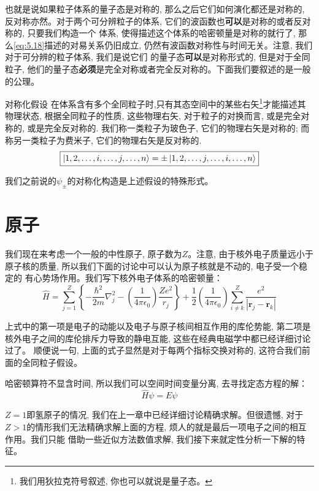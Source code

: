 也就是说如果粒子体系的量子态是对称的, 那么之后它们如何演化都还是对称的, 反对称亦然。对于两个可分辨粒子的体系, 它们的波函数也\textbf{可以}是对称的或者反对称的, 只要我们构造一个
体系, 使得描述这个体系的哈密顿量是对称的就行了, 那么\ref{eq:5.18}描述的对易关系仍旧成立, 仍然有波函数对称性与时间无关。注意, 我们对于可分辨的粒子体系, 我们是说它们
的量子态\textbf{可以}是对称形式的, 但是对于全同粒子, 他们的量子态\textbf{必须}是完全对称或者完全反对称的。下面我们要叙述的是一般的公理。
\begin{proposition}{对称化假设}
    在体系含有多个全同粒子时,只有其态空间中的某些右矢\footnote{我们用狄拉克符号叙述, 你也可以就说是量子态。}才能描述其物理状态, 根据全同粒子的性质, 这些物理右矢, 对于粒子的对换而言, 或是完全对称的, 或是完全反对称的. 我们称一类粒子为玻色子, 它们的物理右矢是对称的; 而称另一类粒子为费米子, 它们的物理右矢是反对称的.
    \begin{equation}
        \boxed{
            \ket{1,2,\ldots,i,\ldots,j,\ldots,n}=\pm\ket{1,2,\ldots,j,\ldots,i,\ldots,n}
        }
    \end{equation}
\end{proposition}
我们之前说的$\psi_\pm$的对称化构造是上述假设的特殊形式。

\section{原子}
我们现在来考虑一个一般的中性原子, 原子数为$Z$。注意, 由于核外电子质量远小于原子核的质量, 所以我们下面的讨论中可以认为原子核就是不动的, 电子受一个稳定的
有心势场作用。我们写下核外电子体系的哈密顿量：
\begin{equation}
    \hat{H}=\sum_{j=1}^{Z}\left\{-\frac{\hbar^{2}}{2 m} \nabla_{j}^{2}-\left(\frac{1}{4 \pi \epsilon_{0}}\right) \frac{Z e^{2}}{r_{j}}\right\}+\frac{1}{2}\left(\frac{1}{4 \pi \epsilon_{0}}\right) \sum_{i \neq k}^{Z} \frac{e^{2}}{\left|\mathbf{r}_{j}-\mathbf{r}_{k}\right|}
\end{equation}

上式中的第一项是电子的动能以及电子与原子核间相互作用的库伦势能, 第二项是核外电子之间的库伦排斥力导致的静电互能, 这些在经典电磁学中都已经详细讨论过了。
顺便说一句, 上面的式子显然是对于每两个指标交换对称的, 这符合我们前面的全同粒子假设。

哈密顿算符不显含时间, 所以我们可以空间时间变量分离, 去寻找定态方程的解：
\[\hat{H}\psi=E\psi\]

$Z=1$即氢原子的情况, 我们在上一章中已经详细讨论精确求解。但很遗憾, 对于$Z>1$的情形我们无法精确求解上面的方程, 烦人的就是最后一项电子之间的相互作用。我们只能
借助一些近似方法数值求解, 我们接下来就定性分析一下解的特征。

